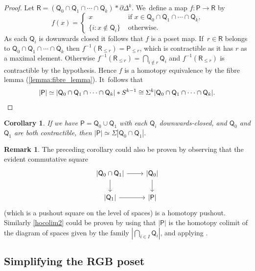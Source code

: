 \documentclass[JEP,XML,SOM,Unicode,NoFloatCountersInSection,published]{cedram}
\theoremstyle{plain}
\newtheorem{cor}[thm]{Corollary}
\theoremstyle{definition}
\newtheorem{rem}[thm]{Remark}
\newcommand{\Po}{\mathsf{P}}
\begin{document}
\begin{proof}
Let $\mathsf{R}=(\mathsf Q_0 \cap \mathsf Q_1\cap \cdots \cap \mathsf Q_k) \ast \partial \mathsf \Delta^{k}$. We~define a map
$ f\colon \mathsf P \to \mathsf{R}$ by
\[
f(x)= \begin{cases} x & \text{ if $x\in \mathsf Q_0 \cap \mathsf Q_1\cap \cdots \cap \mathsf Q_k$,}\\
\{ i : x \not\in \mathsf Q_i \} & \text{ otherwise. } \end{cases}
\]
As each $\mathsf Q_i$ is downwards closed it follows that $f$ is a poset map. If~$r \in \mathsf R$ belongs to $\mathsf Q_0\cap \mathsf Q_1 \cap \cdots \cap \mathsf Q_k$ then $f^{-1}(\mathsf R_{\leq r})=\Po_{\leq r}$, which is contractible as it has $r$ as a maximal element. Otherwise $f^{-1}(\mathsf R_{\leq r})=\bigcap_{i \not\in r} \mathsf Q_i$ and $f^{-1}(\mathsf R_{\leq r})$ is contractible by the hypothesis. Hence $f$ is a homotopy equivalence by the fibre lemma (\ref{lemma:fibre_lemma}). It~follows that
\[
|\mathsf P| \simeq |\mathsf Q_0 \cap \mathsf Q_1\cap \cdots \cap \mathsf Q_k| \ast S^{k-1} \cong \Sigma^{k}|\mathsf Q_0 \cap \mathsf Q_1\cap \cdots \cap \mathsf Q_k|. \qedhere
\]
\end{proof}

\begin{cor}\label{hocolim1}If we have $\mathsf P = \mathsf Q_0 \cup \mathsf Q_1$ with each $\mathsf Q_i$ downwards-closed, and $\mathsf Q_0$ and $\mathsf Q_1$ are both contractible, then $|\mathsf P| \simeq \Sigma |\mathsf Q_0 \cap \mathsf Q_1|.$
\end{cor}

\begin{rem}
The preceding corollary could also be proven by observing that the evident commutative square
\[
\begin{tikzcd}
\vert\mathsf Q_0 \cap \mathsf Q_1\vert \arrow[r]\arrow[d]& \vert\mathsf Q_0 \vert\arrow[d] \\
\vert\mathsf Q_1\vert \arrow[r]& \vert\mathsf P\vert
\end{tikzcd}
\]
(which is a pushout square on the level of spaces) is a homotopy pushout. Similarly \cref{hocolim2} could be proven by using that $|\mathsf P|$ is the homotopy colimit of the diagram of spaces given by the family $|\bigcap_{i \in I}\mathsf Q_i |$, and applying \cite[Ex.\,5.7.5]{munson-volic}.\end{rem}

\subsection{Simplifying the RGB poset}
\end{document}
